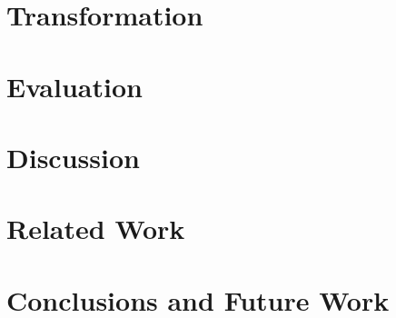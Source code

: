 \documentclass[acmsmall,review,anonymous]{acmart}\settopmatter{printfolios=true,printccs=false,printacmref=false}
\begin{document}
\section{Transformation}
\label{sec:transform}


\section{Evaluation}
\label{sec:evaluation}


\section{Discussion}
\label{sec:discussion}


\section{Related Work}
\label{sec:related-work}


\section{Conclusions and Future Work}
\label{sec:conclusions}

\end{document}
